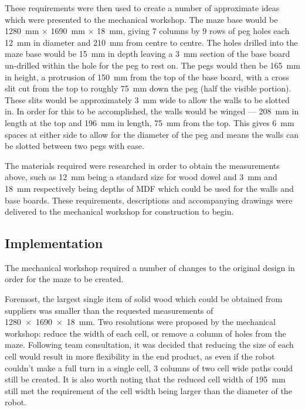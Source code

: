 These requirements were then used to create a number of approximate ideas which
were presented to the mechanical workshop. The maze base would be \SI{1280}{\mm}
$\times$ \SI{1690}{\mm} $\times$ \SI{18}{\mm}, giving 7 columns by 9 rows of
peg holes each \SI{12}{\mm} in diameter and \SI{210}{\mm} from centre to
centre. The holes drilled into the maze base would be \SI{15}{\mm} in depth
leaving a \SI{3}{\mm} section of the base board un-drilled within the hole for the peg to rest on. The pegs would then be
\SI{165}{\mm} in height, a protrusion of \SI{150}{\mm} from the top of the base board, with a cross slit cut from the top to
roughly \SI{75}{\mm} down the peg
(half the visible portion). These slits would be approximately \SI{3}{\mm} wide to allow the walls to be slotted in. In order for
this to be accomplished, the walls would be winged --- \SI{208}{\mm} in length at the top and \SI{196}{\mm} in length,
\SI{75}{\mm} from the top. This gives \SI{6}{\mm} spaces at either side to allow for the diameter of the peg and means the walls
can be slotted between two pegs with ease.

The materials required were researched in order to obtain the measurements
above, such as \SI{12}{\mm} being a standard size for wood dowel and \SI{3}{\mm}
and \SI{18}{\mm} respectively being depths of MDF which could be used for the
walls and base boards. These requirements, descriptions and accompanying
drawings were delivered to the mechanical workshop for construction to begin.

\subsection{Implementation}\label{test/maze/impl}
The mechanical workshop required a number of changes to the original design in
order for the maze to be created.

Foremost, the largest single item of solid wood which could be obtained from
suppliers was smaller than the requested measurements of \SI{1280 x 1690 x 18}
{\mm}. Two resolutions were proposed by the mechanical workshop: reduce
the width of each cell, or remove a column of holes from the maze. Following
team consultation, it was decided that reducing the size of each cell would
result in more flexibility in the end product, as even if the robot couldn't
make a full turn in a single cell, 3 columns of two cell wide paths could still
be created. It is also worth noting that the reduced cell width of \SI{195}{\mm}
still met the requirement of the cell width being larger than the diameter of
the robot.

